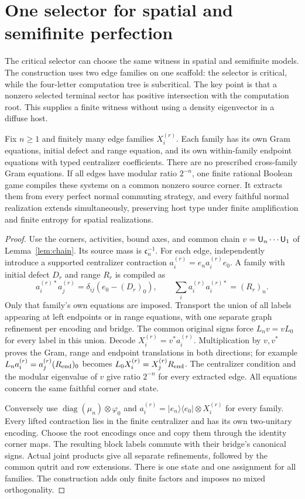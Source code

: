 \section{One selector for spatial and semifinite perfection}\label{sec:iionly}
The critical selector can choose the same witness in spatial and semifinite
models. The construction uses two edge families on one scaffold: the
selector is critical, while the four-letter computation tree is subcritical.
The key point is that a nonzero selected terminal sector has positive
intersection with the computation root. This supplies a finite witness
without using a density eigenvector in a diffuse host.

\begin{lemma}\label{lem:multifamily}
Fix $n\ge1$ and finitely many edge families $X_i^{(r)}$. Each family has
its own Gram equations, initial defect and range equation, and its own
within-family endpoint equations with typed centralizer coefficients.
There are no prescribed cross-family Gram equations. If all edges have
modular ratio $2^{-n}$, one finite rational Boolean game compiles these
systems on a common nonzero source corner. It extracts them from every
perfect normal commuting strategy, and every faithful normal realization
extends simultaneously, preserving host type under finite amplification
and finite entropy for spatial realizations.
\end{lemma}
\begin{proof}
Use the corners, activities, bound axes, and common chain
$v=\mathsf U_n\cdots\mathsf U_1$ of Lemma~\ref{lem:chain}. Its source mass is
$\mathfrak c_n^{-1}$. For each edge, independently introduce a supported
centralizer contraction $a_i^{(r)}=e_na_i^{(r)}e_0$. A family with initial
defect $D_r$ and range $R_r$ is compiled as
\[
 a_i^{(r)*}a_j^{(r)}=\delta_{ij}(e_0-(D_r)_0),\qquad
 \sum_i a_i^{(r)}a_i^{(r)*}=(R_r)_n.
\]
Only that family's own equations are imposed. Transport the union of
all labels appearing at left endpoints or in range equations, with one
separate graph refinement per encoding and bridge. The common original
signs force $L_nv=vL_0$ for every label in this union. Decode
$X_i^{(r)}=v^*a_i^{(r)}$. Multiplication by $v,v^*$ proves the Gram, range
and endpoint translations in both directions; for example
$L_na_i^{(r)}=a_j^{(r)}(R_{\rm end})_0$ becomes
$L_0X_i^{(r)}=X_j^{(r)}R_{\rm end}$. The centralizer condition and the modular
eigenvalue of $v$ give ratio $2^{-n}$ for every extracted edge.
All equations concern the same faithful corner and state.

Conversely use $\operatorname{diag}(\mu_n)\otimes\varphi_0$ and
$a_i^{(r)}=|e_n\rangle\langle e_0|\otimes X_i^{(r)}$ for every family.
Every lifted contraction lies in the finite centralizer and has its
own two-unitary encoding. Choose the root encodings once and copy them
through the identity corner maps. The resulting block labels commute
with their bridge's canonical signs. Actual joint products give all
separate refinements, followed by the common qutrit and row extensions.
There is one state and one assignment for all families. The construction
adds only finite factors and imposes no mixed orthogonality.
\end{proof}

